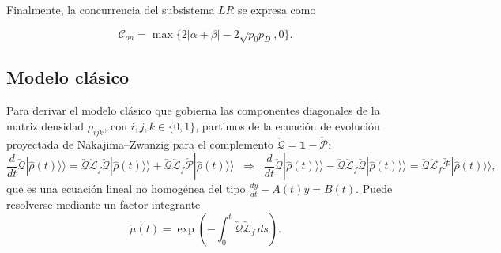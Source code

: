 \begin{appendixs}
Finalmente, la concurrencia del subsistema $LR$ se expresa como

\begin{equation*}
    \mathcal{C}_{on} = \max\{ 2|\alpha+\beta| - 2\sqrt{p_{0}p_{D}},0\}.
\end{equation*}

\label{appendix5final}

\subsection{Modelo clásico}
Para derivar el modelo clásico que gobierna las componentes diagonales de la matriz densidad
$\rho_{ijk}$, con $i,j,k\in\{0,1\}$, partimos de la ecuación de evolución proyectada de
Nakajima–Zwanzig para el complemento $\check{\mathcal{Q}}=\mathbf{1}-\check{\mathcal{P}}$:
\begin{equation*}
    \frac{d}{dt}\check{\mathcal{Q}}|\hat{\rho}(t)\rangle\rangle
    = \check{\mathcal{Q}}\check{\mathcal{L}}_{f}\check{\mathcal{Q}}|\hat{\rho}(t)\rangle\rangle
      + \check{\mathcal{Q}}\check{\mathcal{L}}_{f}\check{\mathcal{P}}|\hat{\rho}(t)\rangle\rangle
    \;\;\Longrightarrow\;\;
    \frac{d}{dt}\check{\mathcal{Q}}|\hat{\rho}(t)\rangle\rangle
      - \check{\mathcal{Q}}\check{\mathcal{L}}_{f}\check{\mathcal{Q}}|\hat{\rho}(t)\rangle\rangle
    = \check{\mathcal{Q}}\check{\mathcal{L}}_{f}\check{\mathcal{P}}|\hat{\rho}(t)\rangle\rangle,
\end{equation*}
que es una ecuación lineal no homogénea del tipo
\(
\frac{dy}{dt}-A(t)y=B(t)
\).
Puede resolverse mediante un factor integrante
\begin{equation*}
    \check{\mu}(t)=\exp\!\left(-\int_{0}^{t}\check{\mathcal{Q}}\check{\mathcal{L}}_{f}\,ds\right).
\end{equation*}


\end{appendixs}
